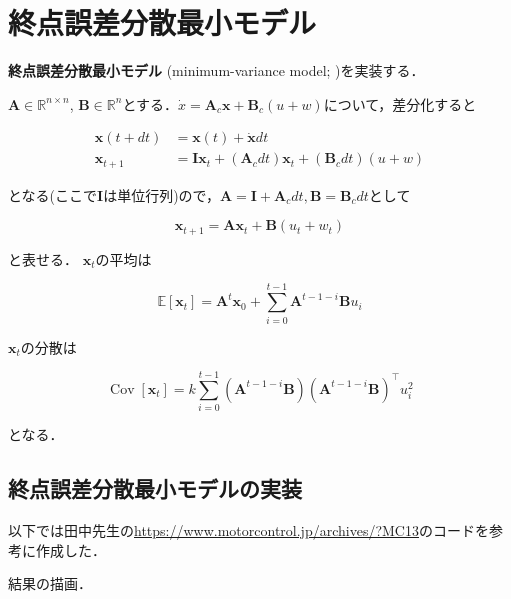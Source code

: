 \section{終点誤差分散最小モデル}
\textbf{終点誤差分散最小モデル} (minimum-variance model; \citep{Harris1998-gj})を実装する．

$\mathbf{A}\in \mathbb{R}^{n\times n}$, $\mathbf{B}\in \mathbb{R}^{n}$とする．$\dot{x}=\mathbf{A}_{c}\mathbf{x}+\mathbf{B}_{c}(u + w)$について，差分化すると


\begin{align}
\mathbf{x}(t+dt)&=\mathbf{x}(t)+\dot{\mathbf{x}}dt\\
\mathbf{x}_{t+1}&=\mathbf{I}\mathbf{x}_t+(\mathbf{A}_{c}dt)\mathbf{x}_t+(\mathbf{B}_{c}dt)(u + w)
\end{align}


となる(ここで$\mathbf{I}$は単位行列)ので，$\mathbf{A}=\mathbf{I}+\mathbf{A}_{c}dt, \mathbf{B}=\mathbf{B}_cdt$として


\begin{equation}
\mathbf{x}_{t+1} = \mathbf{A} \mathbf{x}_t + \mathbf{B}(u_t + w_t)
\end{equation}


と表せる． $\mathbf{x}_t$の平均は


\begin{equation}
\mathbb{E}\left[\mathbf{x}_{t}\right]=\mathbf{A}^{t} \mathbf{x}_{0}+\sum_{i=0}^{t-1} \mathbf{A}^{t-1-i} \mathbf{B} u_{i}
\end{equation}


$\mathbf{x}_t$の分散は


\begin{equation}
\operatorname{Cov}\left[\mathbf{x}_{t}\right]=k \sum_{i=0}^{t-1}\left(\mathbf{A}^{t-1-i} \mathbf{B}\right)\left(\mathbf{A}^{t-1-i} \mathbf{B}\right)^{\top} u_{i}^{2}
\end{equation}


となる．
\subsection{終点誤差分散最小モデルの実装}
以下では田中先生の\url{https://www.motorcontrol.jp/archives/?MC13}のコードを参考に作成した．





結果の描画．



